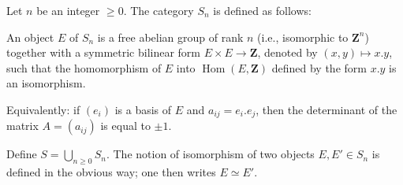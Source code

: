 Let $n$ be an integer $\geq 0$. The category $S_n$ is defined as follows:

An object $E$ of $S_n$ is a free abelian group of rank $n$ (i.e., isomorphic to $\mathbf{Z}^n$) together with a symmetric bilinear form $E \times E \to \mathbf{Z}$, denoted by $(x, y) \mapsto x.y$, such that the homomorphism of $E$ into $\operatorname{Hom}(E, \mathbf{Z})$ defined by the form $x.y$ is an isomorphism.

Equivalently: if $(e_i)$ is a basis of $E$ and $a_{ij} = e_i.e_j$, then the determinant of the matrix $A = (a_{ij})$ is equal to $\pm 1$.

Define $S = \bigcup_{n \geq 0} S_n$. The notion of isomorphism of two objects $E, E' \in S_n$ is defined in the obvious way; one then writes $E \simeq E'$.
